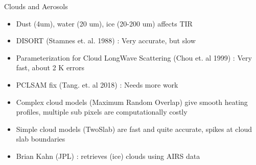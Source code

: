 \documentclass[10pt,t]{beamer}
\begin{document}


\begin{frame}[shrink=2]{Clouds and Aerosols}

\begin{itemize}
  \item Dust (4um), water (20 um), ice (20-200 um) affects TIR
  \item DISORT (Stamnes et. al. 1988) : Very accurate, but slow
  \item Parameterization for Cloud LongWave Scattering (Chou et. al 1999) : Very fast, about 2 K errors
  \item PCLSAM fix (Tang. et. al 2018) : Needs more work
  \item Complex cloud models (Maximum Random Overlap) give smooth heating profiles, multiple sub pixels are computationally costly
  \item Simple cloud models (TwoSlab) are fast and quite accurate, spikes at cloud slab boundaries
  \item Brian Kahn (JPL) : retrieves (ice) clouds using AIRS data
\end{itemize}
\end{frame}

\end{document}
